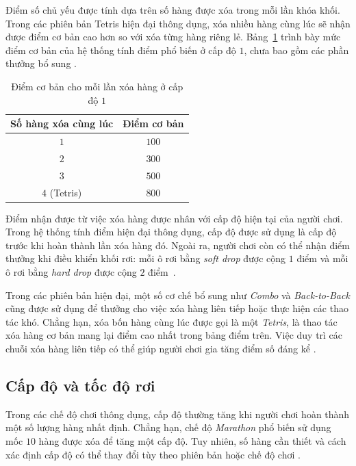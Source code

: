 Điểm số chủ yếu được tính dựa trên số hàng được xóa trong mỗi
lần khóa khối. Trong các phiên bản Tetris hiện đại thông dụng,
xóa nhiều hàng cùng lúc sẽ nhận được điểm cơ bản cao hơn so với
xóa từng hàng riêng lẻ. Bảng~\ref{tab:diem_chung} trình bày mức
điểm cơ bản của hệ thống tính điểm phổ biến ở cấp độ $1$, chưa
bao gồm các phần thưởng bổ sung
\cite{tetris_scoring,tetris_official}.

\begin{table}[H]
\centering
\caption{Điểm cơ bản cho mỗi lần xóa hàng ở cấp độ $1$}
\label{tab:diem_chung}
\begin{tabular}{c c}
\toprule
\textbf{Số hàng xóa cùng lúc} & \textbf{Điểm cơ bản} \\
\midrule
$1$ & $100$ \\
$2$ & $300$ \\
$3$ & $500$ \\
$4$ (Tetris) & $800$ \\
\bottomrule
\end{tabular}
\end{table}

Điểm nhận được từ việc xóa hàng được nhân với cấp độ hiện tại
của người chơi. Trong hệ thống tính điểm hiện đại thông dụng,
cấp độ được sử dụng là cấp độ trước khi hoàn thành lần xóa hàng
đó. Ngoài ra, người chơi còn có thể nhận điểm thưởng khi điều
khiển khối rơi: mỗi ô rơi bằng \textit{soft drop} được cộng
$1$ điểm và mỗi ô rơi bằng \textit{hard drop} được cộng $2$
điểm~\cite{tetris_scoring}.

Trong các phiên bản hiện đại, một số cơ chế bổ sung như
\textit{Combo} và \textit{Back-to-Back} cũng được sử dụng để
thưởng cho việc xóa hàng liên tiếp hoặc thực hiện các thao tác
khó. Chẳng hạn, xóa bốn hàng cùng lúc được gọi là một
\textit{Tetris}, là thao tác xóa hàng cơ bản mang lại điểm cao
nhất trong bảng điểm trên. Việc duy trì các chuỗi xóa hàng
liên tiếp có thể giúp người chơi gia tăng điểm số đáng kể
\cite{tetris_scoring}.

\subsection{Cấp độ và tốc độ rơi}

Trong các chế độ chơi thông dụng, cấp độ thường tăng khi người
chơi hoàn thành một số lượng hàng nhất định. Chẳng hạn, chế độ
\textit{Marathon} phổ biến sử dụng mốc $10$ hàng được xóa để
tăng một cấp độ. Tuy nhiên, số hàng cần thiết và cách xác định
cấp độ có thể thay đổi tùy theo phiên bản hoặc chế độ chơi
\cite{tetris_guideline,tetris_official}.

